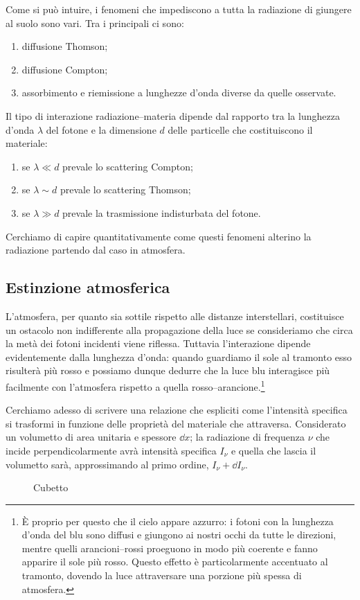     Come si può intuire, i fenomeni che impediscono a tutta la radiazione di giungere al suolo sono vari. Tra i principali ci sono:
    \begin{enumerate}[label=\ding{70}]
        \item diffusione Thomson;
        \item diffusione Compton;
        \item assorbimento e riemissione a lunghezze d'onda diverse da quelle osservate.
    \end{enumerate}
    Il tipo di interazione radiazione--materia dipende dal rapporto tra la lunghezza d'onda $\lambda$ del fotone e la dimensione $d$ delle particelle che costituiscono il materiale:
    \begin{enumerate}[label=\ding{70}]
        \item se $\lambda \ll d$ prevale lo scattering Compton;
        \item se $\lambda \sim d$ prevale lo scattering Thomson;
        \item se $\lambda \gg d$ prevale la trasmissione indisturbata del fotone. 
    \end{enumerate}
    
    Cerchiamo di capire quantitativamente come questi fenomeni alterino la radiazione partendo dal caso in atmosfera.
    \subsection{Estinzione atmosferica}
        L'atmosfera, per quanto sia sottile rispetto alle distanze interstellari, costituisce un ostacolo non indifferente alla propagazione della luce se consideriamo che circa la metà dei fotoni incidenti viene riflessa. Tuttavia l'interazione dipende evidentemente dalla lunghezza d'onda: quando guardiamo il sole al tramonto esso risulterà più rosso e possiamo dunque dedurre che la luce blu interagisce più facilmente con l'atmosfera rispetto a quella rosso--arancione.\footnote{È proprio per questo che il cielo appare azzurro: i fotoni con la lunghezza d'onda del blu sono diffusi e giungono ai nostri occhi da tutte le direzioni, mentre quelli arancioni--rossi proeguono in modo più coerente e fanno apparire il sole più rosso. Questo effetto è particolarmente accentuato al tramonto, dovendo la luce attraversare una porzione più spessa di atmosfera.}

        Cerchiamo adesso di scrivere una relazione che espliciti come l'intensità specifica si trasformi in funzione delle proprietà del materiale che attraversa. Considerato un volumetto di area unitaria e spessore $\dd{x}$; la radiazione di frequenza $\nu$ che incide perpendicolarmente avrà intensità specifica $I_\nu$ e quella che lascia il volumetto sarà, approssimando al primo ordine, $I_\nu + \dd{I_\nu}$.
        \begin{figure}[h]
            \centering
            
            \caption{Cubetto}
        \end{figure}

